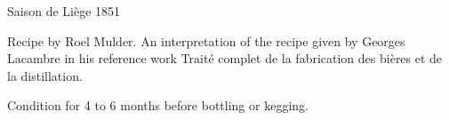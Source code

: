 \begin{recipe}{Saison de Liège 1851} %

\begin{aboutblock}
Recipe by Roel Mulder. An interpretation of the recipe given by Georges Lacambre
in his reference work Traité complet de la fabrication des bières et de la
distillation. 
\end{aboutblock}


\begin{methodandtiming}
 
\begin{mashsteps}
\end{mashsteps}

\begin{fermentationsteps}
\end{fermentationsteps}

\begin{directions}
Condition for 4 to 6 months before bottling or kegging.
\end{directions}

\end{methodandtiming}

\recipebreak

\begin{ingredientsblock}

\begin{malts}
\end{malts}

\begin{hops}
\end{hops}


\end{ingredientsblock}

\end{recipe}


